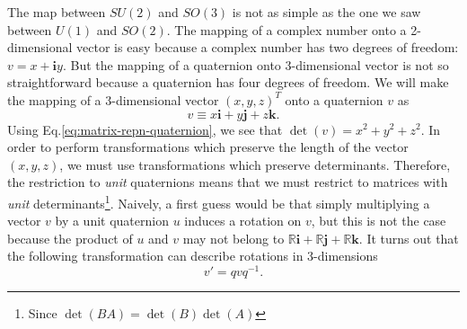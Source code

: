 \documentclass[11pt]{article}
\numberwithin{equation}{section}
\begin{document}
The map between $SU(2)$ and $SO(3)$ is not as simple as the one we saw between $U(1)$ and $SO(2)$. The mapping of a complex number onto a 2-dimensional vector is easy because a complex number has two degrees of freedom: $v=x+\mathbf{i}y$. But the mapping of a quaternion onto 3-dimensional vector is not so straightforward because a quaternion has four degrees of freedom. We will make the mapping of a 3-dimensional vector $(x,y,z)^T$ onto a quaternion $v$ as
\begin{equation}
v \equiv x \mathbf{i} + y \mathbf{j} + z \mathbf{k}.
\end{equation}
Using Eq.\eqref{eq:matrix-repn-quaternion}, we see that $\det(v)=x^2+y^2+z^2$. In order to perform transformations which preserve the length of the vector $(x,y,z)$, we must use transformations which preserve determinants. Therefore, the restriction to \textit{unit} quaternions means that we must restrict to matrices with \textit{unit} determinants\footnote{Since $\det(BA)=\det(B)\det(A)$}. Naively, a first guess would be that simply multiplying a vector $v$ by a unit quaternion $u$ induces a rotation on $v$, but this is not the case because the product of $u$ and $v$ may not belong to $\mathbb{R}\mathbf{i}+\mathbb{R}\mathbf{j}+\mathbb{R}\mathbf{k}$. It turns out that the following transformation can describe rotations in 3-dimensions
\begin{equation}
v'=qvq^{-1}. \label{eq:su2-binary-multiplication}
\end{equation}
\end{document}
